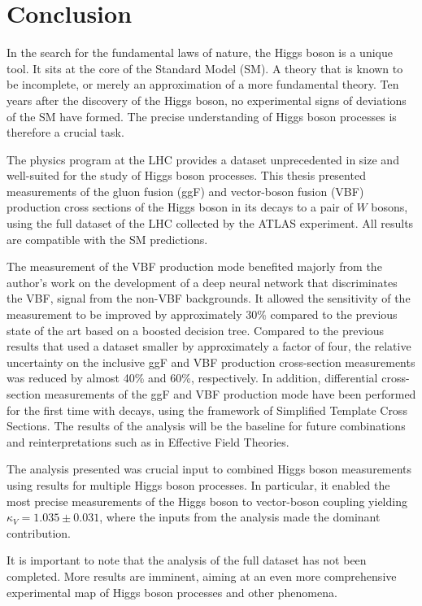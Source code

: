\chapter{Conclusion}
\label{chap:conclusion}
In the search for the fundamental laws of nature, the Higgs boson is a unique tool. 
It sits at the core of the Standard Model (SM). A theory that is known to be incomplete, or merely an approximation of a more fundamental theory. 
Ten years after the discovery of the Higgs boson, no experimental signs of deviations of the SM have formed. 
The precise understanding of Higgs boson processes is therefore a crucial task. 

The physics program at the LHC provides a dataset unprecedented in size and well-suited for the study of Higgs boson processes. 
This thesis presented measurements of the gluon fusion (ggF) and vector-boson fusion (VBF) production cross sections of the Higgs boson in its decays to a pair of $W$ bosons, using the full \RunTwo dataset of the LHC collected by the ATLAS experiment. 
All results are compatible with the SM predictions. 

The measurement of the VBF production mode benefited majorly from the author's work on the development of a deep neural network that discriminates the VBF, \HWWdet signal from the non-VBF backgrounds. 
It allowed the sensitivity of the measurement to be improved by approximately 30\% compared to the previous state of the art based on a boosted decision tree. 
Compared to the previous \RunTwo results that used a dataset smaller by approximately a factor of four, the relative uncertainty on the inclusive ggF and VBF production cross-section measurements was reduced by almost 40\% and 60\%, respectively. 
In addition, differential cross-section measurements of the ggF and VBF production mode have been performed for the first time with \HWW decays, using the framework of Simplified Template Cross Sections. 
The results of the \HWW analysis will be the baseline for future combinations and reinterpretations such as in Effective Field Theories. 

The analysis presented was crucial input to combined Higgs boson measurements using results for multiple Higgs boson processes. 
In particular, it enabled the most precise measurements of the Higgs boson to vector-boson coupling yielding $\kappa_V = 1.035 \pm 0.031$, where the inputs from the \HWWdet analysis made the dominant contribution. 


It is important to note that the analysis of the full \RunTwo dataset has not been completed. 
More results are imminent, aiming at an even more comprehensive experimental map of Higgs boson processes and other phenomena. 

